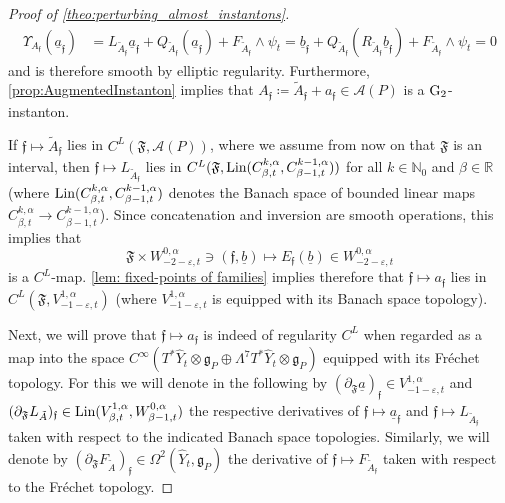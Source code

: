\documentclass[11pt,a4paper]{scrartcl}
\newcommand{\G}{\textup{G}}
\numberwithin{equation}{section}
\theoremstyle{plain}
\theoremstyle{definition}
\theoremstyle{remark}
\begin{document}
\begin{proof}[Proof of \autoref{theo:perturbing_almost_instantons}]
\begin{align*}
\Upsilon_{A_{\mathfrak{f}}}(\underline{a}_{\mathfrak{f}}) & = L_{\tilde{A}_{\mathfrak{f}}}\underline{a}_{\mathfrak{f}} + Q_{\tilde{A}_{\mathfrak{f}}}(\underline{a}_{\mathfrak{f}})+F_{\tilde{A}_{\mathfrak{f}}}\wedge \psi_t = \underline{b}_{\mathfrak{f}} + Q_{\tilde{A}_{\mathfrak{f}}}(R_{\tilde{A}_{\mathfrak{f}}}\underline{b}_{\mathfrak{f}})+F_{\tilde{A}_{\mathfrak{f}}}\wedge \psi_t =  0
\end{align*} 
and is therefore smooth by elliptic regularity. Furthermore, \autoref{prop:AugmentedInstanton} implies that $A_{\mathfrak{f}} \coloneqq \tilde{A}_{\mathfrak{f}}+a_{\mathfrak{f}} \in \mathcal{A}(P)$ is a $\G_2$-instanton.

If $\mathfrak{f} \mapsto \tilde{A}_{\mathfrak{f}}$ lies in $C^L(\mathfrak{F},\mathcal{A}(P))$, where we assume from now on that $\mathfrak{F}$ is an interval, then $\mathfrak{f} \mapsto L_{\tilde{A}_{\mathfrak{f}}}$ lies in $C^L(\mathfrak{F},\textup{Lin}(C^{k,\alpha}_{\beta,t},C^{k-1,\alpha}_{\beta-1,t}))$ for all $k \in \mathbb{N}_0$ and $\beta \in \mathbb{R}$ (where $\textup{Lin}(C^{k,\alpha}_{\beta,t},C^{k-1,\alpha}_{\beta-1,t})$ denotes the Banach space of bounded linear maps $C^{k,\alpha}_{\beta,t} \to C^{k-1,\alpha}_{\beta-1,t}$). Since concatenation and inversion are smooth operations, this implies that \[ \mathfrak{F} \times W^{0,\alpha}_{-2-\varepsilon,t} \ni (\mathfrak{f},\underline{b}) \mapsto E_{\mathfrak{f}}(\underline{b})\in W^{0,\alpha}_{-2-\varepsilon,t} \] is a $C^L$-map. \autoref{lem: fixed-points of families} implies therefore that $\mathfrak{f} \mapsto a_{\mathfrak{f}}$ lies in $C^L(\mathfrak{F},V^{1,\alpha}_{-1-\varepsilon,t})$ (where $V^{1,\alpha}_{-1-\varepsilon,t}$ is equipped with its Banach space topology). 

Next, we will prove that $\mathfrak{f} \mapsto a_{\mathfrak{f}}$ is indeed of regularity $C^L$ when regarded as a map into the space $C^\infty(T^*\hat{Y}_t \otimes \mathfrak{g}_P \oplus \Lambda^7 T^*\hat{Y}_t \otimes \mathfrak{g}_P)$ equipped with its Fréchet topology. For this we will denote in the following by $(\partial_\mathfrak{F}\underline{a})_\mathfrak{f} \in V^{1,\alpha}_{-1-\varepsilon,t}$ and $(\partial_\mathfrak{F}L_{\tilde{A}})_\mathfrak{f} \in \textup{Lin}(V^{1,\alpha}_{\beta,t},W^{0,\alpha}_{\beta-1,t})$ the respective derivatives of $\mathfrak{f}\mapsto \underline{a}_\mathfrak{f}$ and $\mathfrak{f} \mapsto L_{\tilde{A}_\mathfrak{f}}$ taken with respect to the indicated Banach space topologies. Similarly, we will denote by $(\partial_\mathfrak{F}F_{\tilde{A}})_\mathfrak{f} \in \Omega^2(\hat{Y}_t,\mathfrak{g}_P)$ the derivative of $\mathfrak{f} \mapsto F_{\tilde{A}_\mathfrak{f}}$ taken with respect to the Fréchet topology. 


\end{proof}
\end{document}
